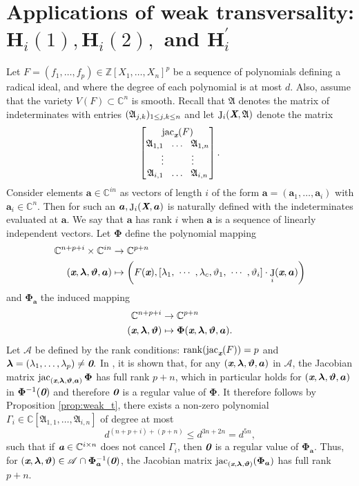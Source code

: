 \documentclass[a4paper]{article}
\def\sA{\mathscr{A}}
\def\A{\mathfrak{A}}
\def\bz{\textit{\textbf{0}}}
\def\Xb{\textit{\textbf{X}}}
\def\xb{\textit{\textbf{x}}}
\def\ab{\textit{\textbf{a}}}
\def\vt{\vartheta}
\DeclareMathOperator{\J}{J}
\DeclareMathOperator{\jac}{jac}
\DeclareMathOperator{\rk}{rank}
\newcommand{\ZZ}{{\mathbb{Z}}}
\def\C{\mathbb{C}}
\def\bbm{\begin{bmatrix}}
\def\ebm{\end{bmatrix}}
\begin{document}
\section{Applications of weak transversality: $\textbf{H}_i(1), \textbf{H}_i(2),$ and $\textbf{H}_i^{'}$}\label{sec:applications}

Let $F=(f_1,\hdots,f_p) \in \ZZ[X_1,\hdots,X_n]^p$ be a sequence of polynomials defining a radical ideal, and where the degree of each polynomial is at most $d$. Also, assume that the variety $V(F)
\subset \C^n$ is smooth. Recall that $\A$ denotes the matrix of indeterminates with entries $(\frak
A_{j,k})_{1\le j,k \le n}$ and let $\J_i(\Xb,\A)$ denote the matrix
    \[
    \bbm 
    \jac_{\xb}(F)\\
    \A_{1,1}~~ \hdots ~~\A_{1,n}\\
    \vdots\hspace{10mm}\vdots\\
     \A_{i,1}~~ \hdots ~~\A_{i,n}
     \ebm.
    \]
Consider elements $\bm a \in \C^{in}$ as vectors of length $i$ of the form $\bm a = (\bm a_1,\hdots,\bm a_i)$ with $\bm a_i \in \C^n$. Then for such an $\bm a, \J_i(\Xb,\bm a)$ is naturally defined with the indeterminates evaluated at $\bm a$. We say that $\bm a$ has rank $i$ when $\bm a$ is a sequence of linearly independent vectors. Let $\bm \Phi$ define the polynomial mapping
    \begin{align*}
    \C^{n+p+i}\times \C^{i n} &\rightarrow \C^{p+n}\\
    (\xb,\bm \lambda,\bm \vt, \bm a)&
    \mapsto
    \left(F(\xb),[\lambda_1, ~\cdots~, \lambda_c, \vt_1, ~\cdots~, \vt_i ] \cdot 
    \J_i(\xb,\bm a)
    \right)
    \end{align*}
    and $\bm \Phi_{\bm a}$ the induced mapping   
    \begin{align*}
    \C^{n+p+i} &\rightarrow \C^{p+n}\\
    (\xb,\bm \lambda,\bm \vt)&\mapsto \bm \Phi(\xb,\bm \lambda,\bm \vt,\bm a).
    \end{align*}
    Let $\sA$ be defined by the rank conditions: $\rk (\jac_{\xb}(F))=p$ and $\bm \lambda=(\lambda_1,\hdots,\lambda_p) \not = \bz.$ In \cite[Section 3.2]{BaGiHeSaSh10}, it is shown that, for any $(\xb, \bm \lambda,\bm \vt, \bm a)$ in $\sA$, the Jacobian matrix $\jac_{(\xb, \bm \lambda, \bm \vt, \bm a)}\bm \Phi$ has full rank $p + n$, which in particular holds for $(\xb, \bm \lambda, \bm \vt, \bm a)$ in $\bm \Phi^{-1}(\bz)$ and therefore $\bz$ is a regular value of $\bm \Phi.$ It therefore follows by Proposition \ref{prop:weak_t}, there exists a non-zero polynomial $\Gamma_i \in \C[\A_{1,1},\hdots,\A_{i,n}]$ of degree at most 
    \[
    d^{(n+p+i)+(p+n)} \leq d^{3n+2n} = d^{5n},
    \]
    such that if $\ab \in \C^{i \times n}$ does not cancel $\Gamma_i$, then $\bz$ is a regular value of $\bm \Phi_{\bm a}.$ Thus, for $(\xb, \bm \lambda,\bm \vt) \in \sA \cap \bm \Phi^{-1}_{\bm a}(\bz)$, the Jacobian matrix $\jac_{(\xb, \bm \lambda,\bm \vt)}(\bm \Phi_{\bm a})$ has full rank $p+n$.  
    
\end{document}
